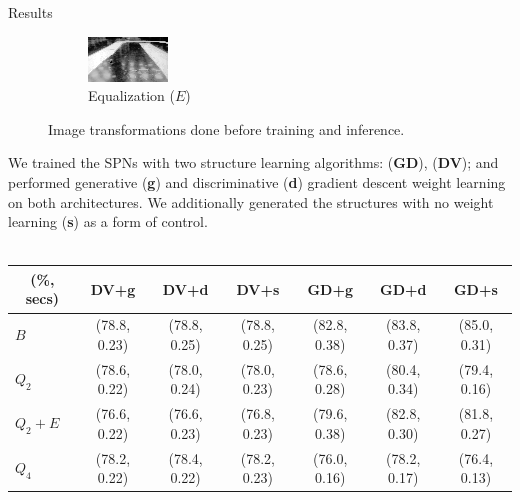 \documentclass[final,hyperref={pdfpagelabels=false},notheorems]{beamer}
\theoremstyle{thesisstyle}
\begin{document}
\begin{frame}[t]
\begin{columns}[t]
\begin{column}{.5225\textwidth}
\begin{block}{Results}
\begin{figure}
\begin{subfigure}{0.3\linewidth}
          \centering\includegraphics[width=\textwidth]{imgs/eq_up.png}
          \captionsetup{justification=centering}
          \caption*{Equalization ($E$)}
        \end{subfigure}
        \caption{Image transformations done before training and inference.}
      \end{figure}
      We trained the SPNs with two structure learning algorithms: \cite{gens-domingos}
      (\textbf{GD}), \cite{clustering} (\textbf{DV}); and performed generative (\textbf{g}) and
      discriminative (\textbf{d}) gradient descent weight learning on both architectures. We
      additionally generated the structures with no weight learning (\textbf{s}) as a form of
      control.\\~\\
      \begin{table}[h]
        \centering
        \begin{tabular}{l|c|c|c|c|c|c}
          \hline
          \multicolumn{1}{c}{\bfseries (\%, secs)} & \multicolumn{1}{c}{\bfseries DV+g} &
          \multicolumn{1}{c}{\bfseries DV+d} & \multicolumn{1}{c}{\bfseries DV+s} &
          \multicolumn{1}{c}{\bfseries GD+g} & \multicolumn{1}{c}{\bfseries GD+d} &
          \multicolumn{1}{c}{\bfseries GD+s}\\
          \hline
          $B$         & (78.8, 0.23) & (78.8, 0.25) & (78.8, 0.25) & (82.8, 0.38) & (83.8, 0.37) & (85.0, 0.31)\\
          $Q_2$       & (78.6, 0.22) & (78.0, 0.24) & (78.0, 0.23) & (78.6, 0.28) & (80.4, 0.34) & (79.4, 0.16)\\
          $Q_2+E$     & (76.6, 0.22) & (76.6, 0.23) & (76.8, 0.23) & (79.6, 0.38) & (82.8, 0.30) & (81.8, 0.27)\\
          $Q_4$       & (78.2, 0.22) & (78.4, 0.22) & (78.2, 0.23) & (76.0, 0.16) & (78.2, 0.17) & (76.4, 0.13)\\

\end{tabular}
\end{table}
\end{block}
\end{column}
\end{columns}
\end{frame}
\end{document}
